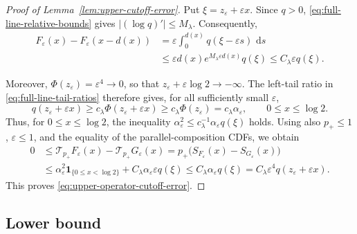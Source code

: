 \documentclass[12pt]{amsart}
\numberwithin{equation}{section}
\theoremstyle{plain}
\theoremstyle{definition}
\newcommand{\ind}{\mathbf 1}
\newcommand{\dd}{\,\mathrm d}
\begin{document}
\begin{proof}[Proof of Lemma~\ref{lem:upper-cutoff-error}]
Put $\xi=z_\varepsilon+\varepsilon x$.  Since $q>0$,
\eqref{eq:full-line-relative-bounds} gives
$|(\log q)'|\le M_\lambda$.  Consequently,
\[
\begin{aligned}
 F_\varepsilon(x)-F_\varepsilon(x-d(x))
 &=\varepsilon\int_0^{d(x)}q(\xi-\varepsilon s)\,\dd s\\
 &\le\varepsilon d(x)e^{M_\lambda\varepsilon d(x)}q(\xi)
 \le C_\lambda\varepsilon q(\xi).
\end{aligned}
\]

Moreover, $\Phi(z_\varepsilon)=\varepsilon^4\to0$, so that
$z_\varepsilon+\varepsilon\log2\to-\infty$.  The left-tail ratio in
\eqref{eq:full-line-tail-ratios} therefore gives, for all sufficiently
small $\varepsilon$,
\[
 q(z_\varepsilon+\varepsilon x)
 \ge c_\lambda\Phi(z_\varepsilon+\varepsilon x)
 \ge c_\lambda\Phi(z_\varepsilon)
 =c_\lambda\alpha_\varepsilon,
 \qquad 0\le x\le\log2.
\]
Thus, for $0\le x\le\log2$, the inequality
$\alpha_\varepsilon^2\le
c_\lambda^{-1}\alpha_\varepsilon q(\xi)$ holds.  Using also
$p_+\le1$, $\varepsilon\le1$, and the equality of the parallel-composition
CDFs, we obtain
\[
\begin{aligned}
 0
 &\le \mathcal T_{p_+}F_\varepsilon(x)
       -\mathcal T_{p_+}G_\varepsilon(x)
 =p_+\bigl(S_{F_\varepsilon}(x)-S_{G_\varepsilon}(x)\bigr)\\
 &\le \alpha_\varepsilon^2\ind_{\{0\le x<\log2\}}
       +C_\lambda\alpha_\varepsilon\varepsilon q(\xi)
 \le C_\lambda\alpha_\varepsilon q(\xi)
 =C_\lambda\varepsilon^4q(z_\varepsilon+\varepsilon x).
\end{aligned}
\]
This proves \eqref{eq:upper-operator-cutoff-error}.
\end{proof}
\subsection{Lower bound}
\end{document}
